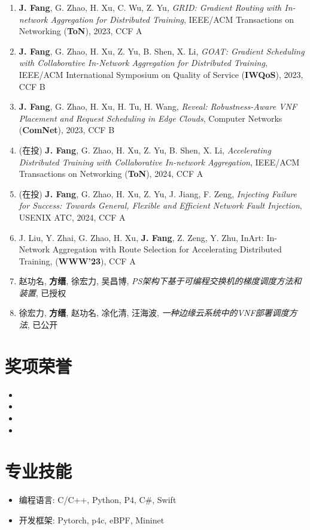 \documentclass{resume}
\begin{document}
\begin{enumerate}[parsep=0.5ex]
  \item \textbf{J. Fang}, G. Zhao, H. Xu, C. Wu, Z. Yu, \textit{GRID: Gradient Routing with In-network Aggregation for Distributed Training}, IEEE/ACM Transactions on Networking (\textbf{ToN}), 2023, CCF A
  \item \textbf{J. Fang}, G. Zhao, H. Xu, Z. Yu, B. Shen, X. Li, \textit{GOAT: Gradient Scheduling with Collaborative In-Network Aggregation for Distributed Training}, IEEE/ACM International Symposium on Quality of Service (\textbf{IWQoS}), 2023, CCF B
  \item \textbf{J. Fang}, G. Zhao, H. Xu, H. Tu, H. Wang, \textit{Reveal: Robustness-Aware VNF Placement and Request Scheduling in Edge Clouds}, Computer Networks (\textbf{ComNet}), 2023, CCF B
  \item (在投) \textbf{J. Fang}, G. Zhao, H. Xu, Z. Yu, B. Shen, X. Li, \textit{Accelerating Distributed Training with Collaborative In-network Aggregation}, IEEE/ACM Transactions on Networking (\textbf{ToN}), 2024, CCF A
  \item (在投) \textbf{J. Fang}, G. Zhao, H. Xu, Z. Yu, J. Jiang, F. Zeng, \textit{Injecting Failure for Success: Towards General, Flexible and Efficient Network Fault Injection}, USENIX ATC, 2024, CCF A
  \item J. Liu, Y. Zhai, G. Zhao, H. Xu, \textbf{J. Fang}, Z. Zeng, Y. Zhu, InArt: In-Network Aggregation with Route Selection for Accelerating Distributed Training, (\textbf{WWW'23}), CCF A
  \item 赵功名, \textbf{方缙}, 徐宏力, 吴昌博, \textit{PS架构下基于可编程交换机的梯度调度方法和装置}, 已授权
  \item 徐宏力, \textbf{方缙}, 赵功名, 凃化清, 汪海波, \textit{一种边缘云系统中的VNF部署调度方法}, 已公开
\end{enumerate}

\section{奖项荣誉}

\begin{itemize}[parsep=0.5ex]
  \item {}
  \item {}
  \item {}
  \item {}
\end{itemize}

\section{专业技能}

\begin{itemize}[parsep=0.5ex]
  \item 编程语言: C/C++, Python, P4, C\#, Swift
  \item 开发框架: Pytorch, p4c, eBPF, Mininet
\end{itemize}
\end{document}
